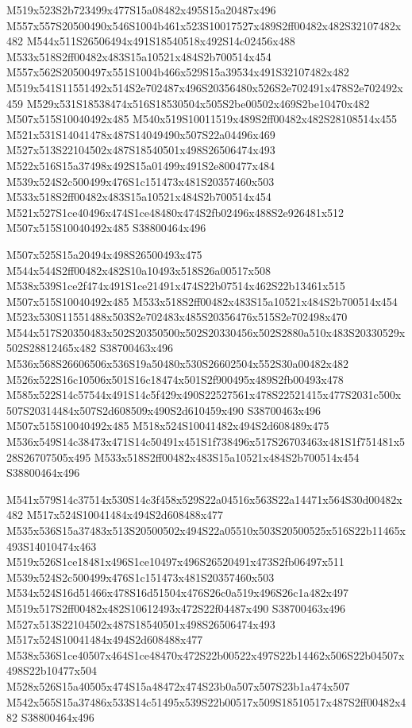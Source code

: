 \documentclass{article}
\begin{document}
\begin{multicols}{2}
M519x523S2b723499x477S15a08482x495S15a20487x496 M557x557S20500490x546S1004b461x523S10017527x489S2ff00482x482S32107482x482 M544x511S26506494x491S18540518x492S14c02456x488 M533x518S2ff00482x483S15a10521x484S2b700514x454 M557x562S20500497x551S1004b466x529S15a39534x491S32107482x482 M519x541S11551492x514S2e702487x496S20356480x526S2e702491x478S2e702492x459 M529x531S18538474x516S18530504x505S2be00502x469S2be10470x482 M507x515S10040492x485 M540x519S10011519x489S2ff00482x482S28108514x455 M521x531S14041478x487S14049490x507S22a04496x469 M527x513S22104502x487S18540501x498S26506474x493 M522x516S15a37498x492S15a01499x491S2e800477x484 M539x524S2c500499x476S1c151473x481S20357460x503 M533x518S2ff00482x483S15a10521x484S2b700514x454 M521x527S1ce40496x474S1ce48480x474S2fb02496x488S2e926481x512 M507x515S10040492x485 S38800464x496

M507x525S15a20494x498S26500493x475 M544x544S2ff00482x482S10a10493x518S26a00517x508 M538x539S1ce2f474x491S1ce21491x474S22b07514x462S22b13461x515 M507x515S10040492x485 M533x518S2ff00482x483S15a10521x484S2b700514x454 M523x530S11551488x503S2e702483x485S20356476x515S2e702498x470 M544x517S20350483x502S20350500x502S20330456x502S2880a510x483S20330529x502S28812465x482 S38700463x496 M536x568S26606506x536S19a50480x530S26602504x552S30a00482x482 M526x522S16c10506x501S16c18474x501S2f900495x489S2fb00493x478 M585x522S14c57544x491S14c5f429x490S22527561x478S22521415x477S2031c500x507S20314484x507S2d608509x490S2d610459x490 S38700463x496 M507x515S10040492x485 M518x524S10041482x494S2d608489x475 M536x549S14c38473x471S14c50491x451S1f738496x517S26703463x481S1f751481x528S26707505x495 M533x518S2ff00482x483S15a10521x484S2b700514x454 S38800464x496

M541x579S14c37514x530S14c3f458x529S22a04516x563S22a14471x564S30d00482x482 M517x524S10041484x494S2d608488x477 M535x536S15a37483x513S20500502x494S22a05510x503S20500525x516S22b11465x493S14010474x463 M519x526S1ce18481x496S1ce10497x496S26520491x473S2fb06497x511 M539x524S2c500499x476S1c151473x481S20357460x503 M534x524S16d51466x478S16d51504x476S26c0a519x496S26c1a482x497 M519x517S2ff00482x482S10612493x472S22f04487x490 S38700463x496 M527x513S22104502x487S18540501x498S26506474x493 M517x524S10041484x494S2d608488x477 M538x536S1ce40507x464S1ce48470x472S22b00522x497S22b14462x506S22b04507x498S22b10477x504 M528x526S15a40505x474S15a48472x474S23b0a507x507S23b1a474x507 M542x565S15a37486x533S14c51495x539S22b00517x509S18510517x487S2ff00482x482 S38800464x496


\end{multicols}
\end{document}
